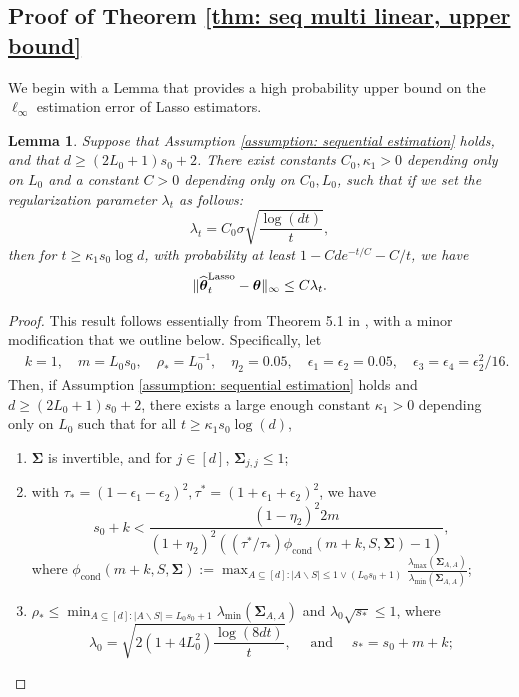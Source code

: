 \documentclass[aos,preprint]{imsart}
\theoremstyle{plain}
\newtheorem{lemma}[theorem]{Lemma}
\theoremstyle{definition}
\newcommand{\btheta}{\boldsymbol{\theta}}
\newcommand{\hbtheta}{\widehat{\boldsymbol{\theta}}}
\newcommand{\bSigma}{\boldsymbol{\Sigma}}
\newcommand{\lmin}[1]{\lambda_{\min}\left(#1\right)}
\newcommand{\lmax}[1]{\lambda_{\max}\left(#1\right)}
\newcommand{\ltheta}{\hbtheta^{\textup{Lasso}}}
\begin{document}
\begin{appendix}
\subsection{Proof of Theorem \ref{thm: seq multi linear, upper bound}} \label{sec: proof of seq multi linear, upper bound}
We begin with a Lemma that provides a high probability upper bound on the $\ell_{\infty}$ estimation error of Lasso estimators. 

\begin{lemma}
\label{lemma: improved_ell_infty}
Suppose that Assumption \ref{assumption: sequential estimation} holds, and that $d \ge (2L_0+1)s_0 + 2$. There exist constants $C_0, \kappa_1>0$ depending only on $L_0$ and a constant $C >0$ depending only on $C_0, L_0$, such that if we set the regularization parameter $\lambda_t$  as follows:
$$
\lambda_t = C_0 \sigma \sqrt{\frac{\log(dt)}{t}},
$$
then for $t\ge \kappa_1s_0\log d$, with probability at least $1 - {C}de^{-t/{C}} - {C}/t$, we have
$$\|\ltheta_t -\btheta \|_{\infty} \le C\lambda_t.$$
\end{lemma}
\begin{proof}
This result follows essentially from Theorem 5.1 in \cite{bellec2022biasing}, with a minor modification that we outline below. Specifically, let 
  \begin{align*}
    &k=1, \quad m=L_0 s_0, \quad \rho_* = L_0^{-1}, \quad \eta_2=0.05, \quad  \epsilon_1=\epsilon_2=0.05, \quad \epsilon_3=\epsilon_4=\epsilon_2^2/16. \end{align*}
Then, if Assumption \ref{assumption: sequential estimation} holds and $d \ge (2L_0+1)s_0 + 2$, there exists a large enough constant $\kappa_1 > 0$ depending only on $L_0$ such that for all $t \geq \kappa_1 s_0 \log(d)$,
\begin{enumerate}[label=\roman*)]
    \item $\bSigma$ is invertible, and for $j \in [d]$, $\bSigma_{j,j} \leq 1$;
    \item with $\tau_* = (1-\epsilon_1-\epsilon_2)^2, \tau^* = (1+\epsilon_1+\epsilon_2)^2$, we have 
    $$
    s_0+k <  \frac{(1-\eta_2)^2 2m}{(1+\eta_2)^2 \left((\tau^*/\tau_*) \phi_{\text{cond}}(m+k,S,\bSigma)-1\right)},
    $$
    where $\phi_{\text{cond}}(m+k,S,\bSigma) := \max_{A\subseteq [d]: |A\backslash S|\le 1\vee (L_0s_0+1)} \frac{\lmax{\bSigma_{A,A}}}{\lmin{\bSigma_{A,A}}}$;

    \item $\rho_* \leq \min_{A\subseteq[d]: |A\backslash S|=L_0s_0+1} \lmin{\bSigma_{A,A}}$ and $\lambda_0\sqrt{s_*}\le 1$, where
    $$\lambda_0 = \sqrt{2(1+4L_0^2)\frac{\log (8dt)}{t}}, \quad \text{ and } \quad s_* = s_0+m+k;
    $$


\end{enumerate}
\end{proof}
\end{appendix}
\end{document}
